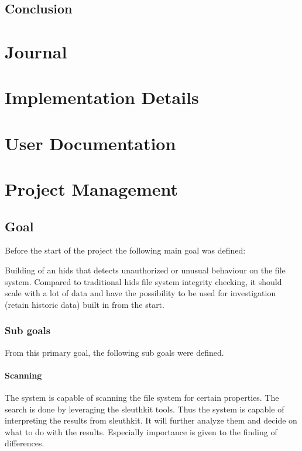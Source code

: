 \documentclass[
	a4paper,					%
	10pt,							%
	twoside,					%
	openright,				%
	notitlepage,			%
	parskip=half,			%
]{scrreprt}					%
\begin{document}
\section{Conclusion}

\chapter{Journal}

\chapter{Implementation Details}

\chapter{User Documentation}

\chapter{Project Management}

\section{Goal}
\label{apdx-sec:goal}
Before the start of the project the following main goal was defined:

Building of an \gls{hids} that detects unauthorized or unusual behaviour on the file system. Compared to traditional \gls{hids} file system integrity checking, it should scale with a lot of data and have the possibility to be used for investigation (retain historic data) built in from the start.

\subsection{Sub goals}

From this primary goal, the following sub goals were defined. 

\subsubsection{Scanning}
The system is capable of scanning the file system for certain properties. The search is done by leveraging the sleuthkit tools. Thus the system is capable of interpreting the results from sleuthkit. It will further analyze them and decide on what to do with the results. Especially importance is given to the finding of differences.
\end{document}
